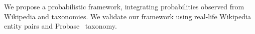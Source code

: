 


We propose a probabilistic framework, integrating probabilities observed
from Wikipedia and taxonomies.
We validate our framework using real-life Wikipedia entity pairs and Probase~\cite{wu2012probase} taxonomy.

